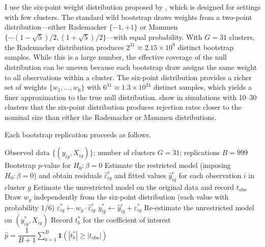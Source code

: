 I use the six-point weight distribution proposed by
\citet{Webb2023}, which is designed for settings with few
clusters.
The standard wild bootstrap draws weights from a two-point
distribution---either Rademacher $\{-1, +1\}$ or Mammen
$\{-(1{-}\sqrt{5})/2, (1{+}\sqrt{5})/2\}$---with equal
probability.
With $G = 31$ clusters, the Rademacher distribution produces
$2^{31} \approx 2.15 \times 10^9$ distinct bootstrap samples.
While this is a large number, the effective coverage of the
null distribution can be uneven because each bootstrap draw
assigns the same weight to all observations within a cluster.
The six-point distribution provides a richer set of weights
$\{w_1, \ldots, w_6\}$ with $6^{31} \approx 1.3 \times 10^{24}$
distinct samples, which yields a finer approximation to the
true null distribution.
\citet{Webb2023} show in simulations with 10--30 clusters that
the six-point distribution produces rejection rates closer to
the nominal size than either the Rademacher or Mammen
distributions.

Each bootstrap replication proceeds as follows.

\begin{algorithm}[htbp]
\caption{Wild Cluster Restricted Bootstrap (WCR)}\label{alg:wcr_bootstrap}
\begin{algorithmic}[1]
\Require Observed data $\{(y_{ig}, X_{ig})\}$; number of clusters $G = 31$; replications $B = 999$
\Ensure Bootstrap $p$-value for $H_0\colon \beta = 0$
\State Estimate the restricted model (imposing $H_0\colon \beta = 0$) and obtain residuals $\hat{\varepsilon}_{ig}^{r}$ and fitted values $\hat{y}_{ig}^{r}$ for each observation $i$ in cluster $g$
\State Estimate the unrestricted model on the original data and record $t_{\text{obs}}$
        \State Draw $w_g$ independently from the six-point distribution (each value with probability $1/6$)
    \EndFor
        \State $\varepsilon^*_{ig} \gets w_g \cdot \hat{\varepsilon}_{ig}^{r}$ 
        \State $y^*_{ig} \gets \hat{y}_{ig}^{r} + \varepsilon^*_{ig}$
    \EndFor
    \State Re-estimate the unrestricted model on $(y^*_{ig}, X_{ig})$
    \State Record $t^*_b$ for the coefficient of interest
\EndFor
\State \Return $\hat{p} = \dfrac{1}{B+1}\displaystyle\sum_{b=1}^{B} \mathbf{1}\!\left(|t^*_b| \geq |t_{\text{obs}}|\right)$
\end{algorithmic}
\end{algorithm}


